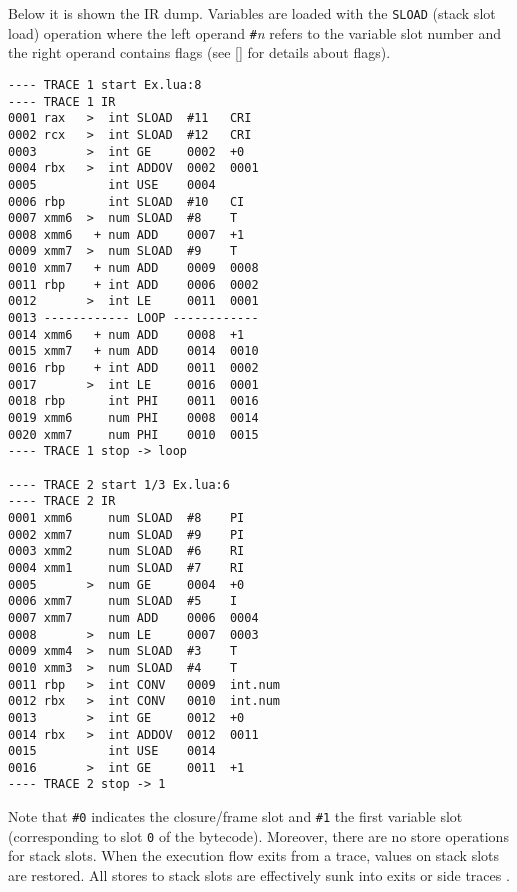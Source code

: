 \noindent
Below it is shown the IR dump. Variables are loaded with the \texttt{SLOAD} (stack slot load) operation where the left operand  \texttt{\#}\textit{n} refers to the variable slot number and the right operand contains flags (see \ref{} for details about flags).

\begin{multicols}{2}
\begin{lstlisting}[style=DumpStyle]
---- TRACE 1 start Ex.lua:8
---- TRACE 1 IR
0001 rax   >  int SLOAD  #11   CRI
0002 rcx   >  int SLOAD  #12   CRI
0003       >  int GE     0002  +0  
0004 rbx   >  int ADDOV  0002  0001
0005          int USE    0004
0006 rbp      int SLOAD  #10   CI
0007 xmm6  >  num SLOAD  #8    T
0008 xmm6   + num ADD    0007  +1  
0009 xmm7  >  num SLOAD  #9    T
0010 xmm7   + num ADD    0009  0008
0011 rbp    + int ADD    0006  0002
0012       >  int LE     0011  0001
0013 ------------ LOOP ------------
0014 xmm6   + num ADD    0008  +1  
0015 xmm7   + num ADD    0014  0010
0016 rbp    + int ADD    0011  0002
0017       >  int LE     0016  0001
0018 rbp      int PHI    0011  0016
0019 xmm6     num PHI    0008  0014
0020 xmm7     num PHI    0010  0015
---- TRACE 1 stop -> loop

---- TRACE 2 start 1/3 Ex.lua:6
---- TRACE 2 IR
0001 xmm6     num SLOAD  #8    PI
0002 xmm7     num SLOAD  #9    PI
0003 xmm2     num SLOAD  #6    RI
0004 xmm1     num SLOAD  #7    RI
0005       >  num GE     0004  +0  
0006 xmm7     num SLOAD  #5    I
0007 xmm7     num ADD    0006  0004
0008       >  num LE     0007  0003
0009 xmm4  >  num SLOAD  #3    T
0010 xmm3  >  num SLOAD  #4    T
0011 rbp   >  int CONV   0009  int.num
0012 rbx   >  int CONV   0010  int.num
0013       >  int GE     0012  +0  
0014 rbx   >  int ADDOV  0012  0011
0015          int USE    0014
0016       >  int GE     0011  +1  
---- TRACE 2 stop -> 1

\end{lstlisting}
\end{multicols}

\noindent
Note that \texttt{\#0} indicates the closure/frame slot and \texttt{\#1} the first variable slot (corresponding to slot \texttt{0} of the bytecode). Moreover, there are no store operations for stack slots. When the execution flow exits from a trace, values on stack slots are restored. All stores to stack slots are effectively sunk into exits or side traces \cite{luajit-ir}.

